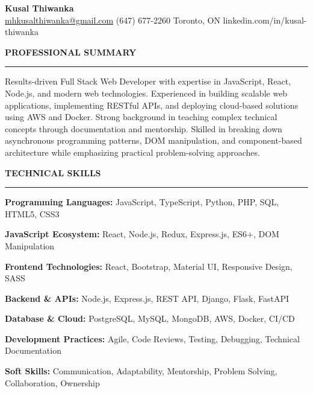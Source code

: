\documentclass[10pt,letterpaper]{article}
\begin{document}
\begin{center}
{\LARGE\textbf{Kusal Thiwanka}}\\[3pt]
\href{mailto:mhkusalthiwanka@gmail.com}{mhkusalthiwanka@gmail.com}\hspace{2em}%
(647) 677{-}2260\hspace{2em}%
Toronto, ON\hspace{2em}
linkedin.com/in/kusal-thiwanka
\end{center}

\vspace{6pt}

\textbf{PROFESSIONAL SUMMARY}\\[-8pt]
\noindent\rule{\textwidth}{1pt}

\vspace{-2pt}

Results-driven Full Stack Web Developer with expertise in JavaScript, React, Node.js, and modern web technologies. Experienced in building scalable web applications, implementing RESTful APIs, and deploying cloud-based solutions using AWS and Docker. Strong background in teaching complex technical concepts through documentation and mentorship. Skilled in breaking down asynchronous programming patterns, DOM manipulation, and component-based architecture while emphasizing practical problem-solving approaches.

\vspace{8pt}

\textbf{TECHNICAL SKILLS}\\[-8pt]
\noindent\rule{\textwidth}{1pt}

\vspace{-2pt}

\textbf{Programming Languages:} JavaScript, TypeScript, Python, PHP, SQL, HTML5, CSS3

\textbf{JavaScript Ecosystem:} React, Node.js, Redux, Express.js, ES6+, DOM Manipulation

\textbf{Frontend Technologies:} React, Bootstrap, Material UI, Responsive Design, SASS

\textbf{Backend \& APIs:} Node.js, Express.js, REST API, Django, Flask, FastAPI

\textbf{Database \& Cloud:} PostgreSQL, MySQL, MongoDB, AWS, Docker, CI/CD

\textbf{Development Practices:} Agile, Code Reviews, Testing, Debugging, Technical Documentation

\textbf{Soft Skills:} Communication, Adaptability, Mentorship, Problem Solving, Collaboration, Ownership
\end{document}
